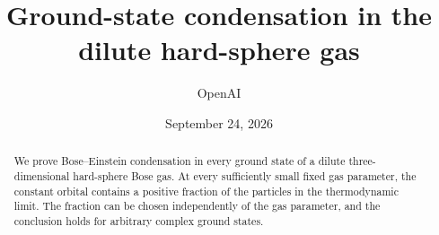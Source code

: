 \documentclass[11pt]{article}
\title{Ground-state condensation in the dilute hard-sphere gas}
\author{OpenAI}
\date{September 24, 2026}
\numberwithin{equation}{section}
\theoremstyle{definition}
\theoremstyle{remark}
\begin{document}
\maketitle
\begin{abstract}
We prove Bose--Einstein condensation in every ground state of a dilute
three-dimensional hard-sphere Bose gas. At every sufficiently small fixed gas
parameter, the constant orbital contains a positive fraction of the particles
in the thermodynamic limit. The fraction can be chosen independently of the
gas parameter, and the conclusion holds for arbitrary complex ground states.
\end{abstract}
\tableofcontents












\end{document}
